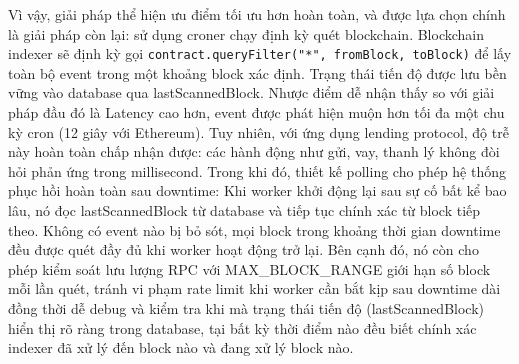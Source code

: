 \documentclass[../DoAn.tex]{subfiles}
\begin{document}
Vì vậy, giải pháp thể hiện ưu điểm tối ưu hơn hoàn toàn, và được lựa chọn chính là giải pháp còn lại: sử dụng croner chạy định kỳ quét blockchain. Blockchain indexer sẽ định kỳ gọi \texttt{contract.queryFilter("*", fromBlock, toBlock)} để lấy toàn bộ event trong một khoảng block xác định. Trạng thái tiến độ được lưu bền vững vào database qua lastScannedBlock. Nhược điểm dễ nhận thấy so với giải pháp đầu đó là Latency cao hơn, event được phát hiện muộn hơn tối đa một chu kỳ cron (12 giây với Ethereum). Tuy nhiên, với ứng dụng lending protocol, độ trễ này hoàn toàn chấp nhận được: các hành động như gửi, vay, thanh lý không đòi hỏi phản ứng trong millisecond. Trong khi đó, thiết kế polling cho phép hệ thống phục hồi hoàn toàn sau downtime: Khi worker khởi động lại sau sự cố bất kể bao lâu, nó đọc lastScannedBlock từ database và tiếp tục chính xác từ block tiếp theo. Không có event nào bị bỏ sót, mọi block trong khoảng thời gian downtime đều được quét đầy đủ khi worker hoạt động trở lại. Bên cạnh đó, nó còn cho phép kiểm soát lưu lượng RPC với MAX\_BLOCK\_RANGE giới hạn số block mỗi lần quét, tránh vi phạm rate limit khi worker cần bắt kịp sau downtime dài đồng thời dễ debug và kiểm tra khi mà trạng thái tiến độ (lastScannedBlock) hiển thị rõ ràng trong database, tại bất kỳ thời điểm nào đều biết chính xác indexer đã xử lý đến block nào và đang xử lý block nào.

\begin{table}[H]
\centering
{}
\caption{So sánh hai hướng tiếp cận index blockchain}
\label{table:blockchain_indexing_comparison}
\end{table}
\end{document}

